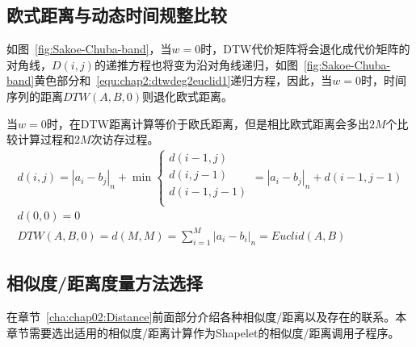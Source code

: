 

\subsection{欧式距离与动态时间规整比较}
\label{chap02:euclid2Dtw}


如图~\ref{fig:Sakoe-Chuba-band}，当$w=0$时，DTW代价矩阵将会退化成代价矩阵的对角线，$D(i,j)$的递推方程也将变为沿对角线递归，如图~\ref{fig:Sakoe-Chuba-band}黄色部分和~\ref{equ:chap2:dtwdeg2euclid1}递归方程，因此，当$w=0$时，时间序列的距离$DTW(A,B,0)$则退化欧式距离。

当$w=0$时，在DTW距离计算等价于欧氏距离，但是相比欧式距离会多出$2M$个比较计算过程和$2M$次访存过程。
\begin{equation}
\label{equ:chap2:dtwdeg2euclid1}
\begin{array}{l}
d(i,j) = |a_i-b_j|_n + \min
\begin{cases}
d(i-1,j)\\
d(i,j-1)\\
d(i-1,j-1)\\
\end{cases} = |a_i-b_j|_n + d(i-1,j-1)
\\[0.2cm]
d(0,0)=0 \\[0.2cm]
DTW(A,B,0) = d(M,M) = \sum_{i=1}^{M}|a_i-b_i|_n = Euclid(A,B)
\end{array}
\end{equation}



\subsection{相似度/距离度量方法选择}

在章节~\ref{cha:chap02:Distance}前面部分介绍各种相似度/距离以及存在的联系。本章节需要选出适用的相似度/距离计算作为Shapelet的相似度/距离调用子程序。

